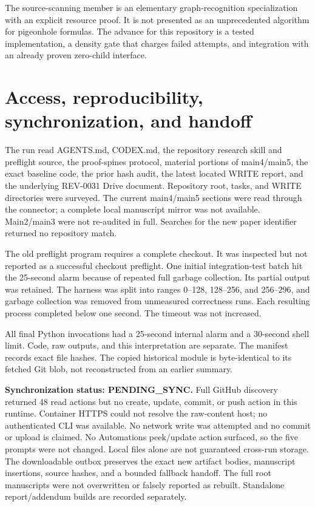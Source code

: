 \documentclass[11pt]{article}
\begin{document}
The source-scanning member is an elementary graph-recognition specialization with an explicit resource proof. It is not presented as an unprecedented algorithm for pigeonhole formulas. The advance for this repository is a tested implementation, a density gate that charges failed attempts, and integration with an already proven zero-child interface.

\section{Access, reproducibility, synchronization, and handoff}
The run read AGENTS.md, CODEX.md, the repository research skill and preflight source, the proof-spines protocol, material portions of main4/main5, the exact baseline code, the prior hash audit, the latest located WRITE report, and the underlying REV-0031 Drive document. Repository root, tasks, and WRITE directories were surveyed. The current main4/main5 sections were read through the connector; a complete local manuscript mirror was not available. Main2/main3 were not re-audited in full. Searches for the new paper identifier returned no repository match.

The old preflight program requires a complete checkout. It was inspected but not reported as a successful checkout preflight. One initial integration-test batch hit the 25-second alarm because of repeated full garbage collection. Its partial output was retained. The harness was split into ranges 0--128, 128--256, and 256--296, and garbage collection was removed from unmeasured correctness runs. Each resulting process completed below one second. The timeout was not increased.

All final Python invocations had a 25-second internal alarm and a 30-second shell limit. Code, raw outputs, and this interpretation are separate. The manifest records exact file hashes. The copied historical module is byte-identical to its fetched Git blob, not reconstructed from an earlier summary.

\textbf{Synchronization status: PENDING\_SYNC.} Full GitHub discovery returned 48 read actions but no create, update, commit, or push action in this runtime. Container HTTPS could not resolve the raw-content host; no authenticated CLI was available. No network write was attempted and no commit or upload is claimed. No Automations peek/update action surfaced, so the five prompts were not changed. Local files alone are not guaranteed cross-run storage. The downloadable outbox preserves the exact new artifact bodies, manuscript insertions, source hashes, and a bounded fallback handoff. The full root manuscripts were not overwritten or falsely reported as rebuilt. Standalone report/addendum builds are recorded separately.
\end{document}
